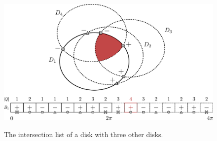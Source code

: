 \begin{figure}[!htb]
	\centering
	
	\caption{The intersection list of a disk with three other disks.}
	\includegraphics[scale=.3]{tex/figures/3_disks_intersect_.pdf}
	\fautor
	\label{fig:array_disks2}
\end{figure}

		
		
		
		
%		
		

